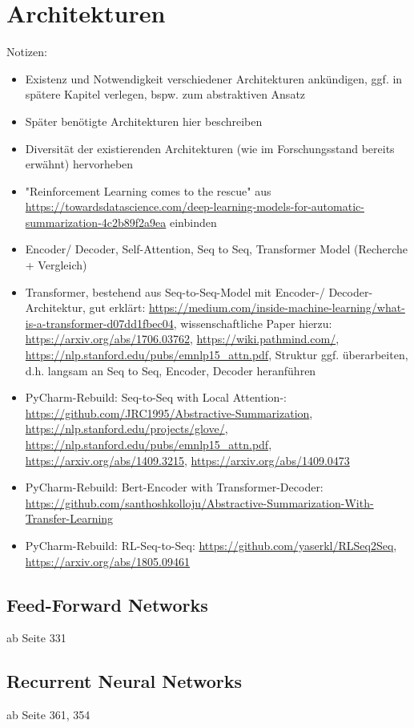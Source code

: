 \section{Architekturen}
Notizen:
\begin{itemize}
	\item Existenz und Notwendigkeit verschiedener Architekturen ankündigen, ggf. in spätere Kapitel verlegen, bspw. zum abstraktiven Ansatz
	\item Später benötigte Architekturen hier beschreiben
	\item Diversität der existierenden Architekturen (wie im Forschungsstand bereits erwähnt) hervorheben
	\item "Reinforcement Learning comes to the rescue" aus \url{https://towardsdatascience.com/deep-learning-models-for-automatic-summarization-4c2b89f2a9ea} einbinden
	\item Encoder/ Decoder, Self-Attention, Seq to Seq, Transformer Model (Recherche + Vergleich)
	\item Transformer, bestehend aus Seq-to-Seq-Model mit Encoder-/ Decoder-Architektur, gut erklärt: \url{https://medium.com/inside-machine-learning/what-is-a-transformer-d07dd1fbec04}, wissenschaftliche Paper hierzu: \url{https://arxiv.org/abs/1706.03762}, \url{https://wiki.pathmind.com/}, \url{https://nlp.stanford.edu/pubs/emnlp15_attn.pdf}, Struktur ggf. überarbeiten, d.h. langsam an Seq to Seq, Encoder, Decoder heranführen
	\item PyCharm-Rebuild: Seq-to-Seq with Local Attention-: \url{https://github.com/JRC1995/Abstractive-Summarization}, \url{https://nlp.stanford.edu/projects/glove/}, \url{https://nlp.stanford.edu/pubs/emnlp15_attn.pdf}, \url{https://arxiv.org/abs/1409.3215}, \url{https://arxiv.org/abs/1409.0473}
	\item PyCharm-Rebuild: Bert-Encoder with Transformer-Decoder: \url{https://github.com/santhoshkolloju/Abstractive-Summarization-With-Transfer-Learning}
	\item PyCharm-Rebuild: RL-Seq-to-Seq: \url{https://github.com/yaserkl/RLSeq2Seq}, \url{https://arxiv.org/abs/1805.09461}
\end{itemize}


\subsection{Feed-Forward Networks}
\cite{ZHA20} ab Seite 331


\subsection{Recurrent Neural Networks}
\cite{ZHA20} ab Seite 361, 354


